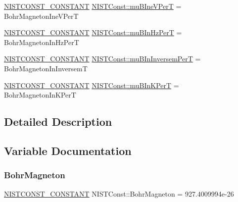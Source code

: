 \begin{DoxyCompactItemize}
\item 
\mbox{\hyperlink{group___n_i_s_t_const-_macros_ga2b0fc1d7452373f816175dd86ce26729}{N\+I\+S\+T\+C\+O\+N\+S\+T\+\_\+\+C\+O\+N\+S\+T\+A\+NT}} \mbox{\hyperlink{group___n_i_s_t_const-_bohr_magneton_gac0165514adb8e7249ee914b3f474a744}{N\+I\+S\+T\+Const\+::mu\+B\+Ine\+V\+PerT}} = Bohr\+Magneton\+Ine\+V\+PerT
\item 
\mbox{\hyperlink{group___n_i_s_t_const-_macros_ga2b0fc1d7452373f816175dd86ce26729}{N\+I\+S\+T\+C\+O\+N\+S\+T\+\_\+\+C\+O\+N\+S\+T\+A\+NT}} \mbox{\hyperlink{group___n_i_s_t_const-_bohr_magneton_ga034678e5623f2ac3e279bddd75441ba3}{N\+I\+S\+T\+Const\+::mu\+B\+In\+Hz\+PerT}} = Bohr\+Magneton\+In\+Hz\+PerT
\item 
\mbox{\hyperlink{group___n_i_s_t_const-_macros_ga2b0fc1d7452373f816175dd86ce26729}{N\+I\+S\+T\+C\+O\+N\+S\+T\+\_\+\+C\+O\+N\+S\+T\+A\+NT}} \mbox{\hyperlink{group___n_i_s_t_const-_bohr_magneton_ga6da84d6557bbc4d5af7411fae3375bc9}{N\+I\+S\+T\+Const\+::mu\+B\+In\+Inversem\+PerT}} = Bohr\+Magneton\+In\+InversemT
\item 
\mbox{\hyperlink{group___n_i_s_t_const-_macros_ga2b0fc1d7452373f816175dd86ce26729}{N\+I\+S\+T\+C\+O\+N\+S\+T\+\_\+\+C\+O\+N\+S\+T\+A\+NT}} \mbox{\hyperlink{group___n_i_s_t_const-_bohr_magneton_gafaf9e1dcc714551e3affd46bd94a81e1}{N\+I\+S\+T\+Const\+::mu\+B\+In\+K\+PerT}} = Bohr\+Magneton\+In\+K\+PerT
\end{DoxyCompactItemize}


\subsection{Detailed Description}


\subsection{Variable Documentation}
\mbox{\label{group___n_i_s_t_const-_bohr_magneton_ga2804e91f010b40a5c11a46506e6c1926}} 
\subsubsection{\texorpdfstring{Bohr\+Magneton}{BohrMagneton}}
{\footnotesize\ttfamily \mbox{\hyperlink{group___n_i_s_t_const-_macros_ga2b0fc1d7452373f816175dd86ce26729}{N\+I\+S\+T\+C\+O\+N\+S\+T\+\_\+\+C\+O\+N\+S\+T\+A\+NT}} N\+I\+S\+T\+Const\+::\+Bohr\+Magneton = 927.\+4009994e-\/26}

